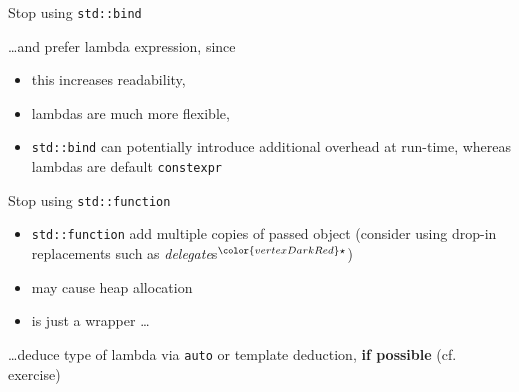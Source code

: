 \begin{frame}[fragile]{Stop using \texttt{std::bind}}

    \ldots and prefer lambda expression, since
    \begin{itemize}
        \item this increases readability,
        \item lambdas are much more flexible,
        \item \texttt{std::bind} can potentially introduce additional overhead at run-time, whereas lambdas are default \texttt{constexpr}
    \end{itemize}
\end{frame}

\begin{frame}[fragile]{Stop using \texttt{std::function}}

    \begin{itemize}
        \item \texttt{std::function} add multiple copies of passed object (consider using drop-in replacements such as \textit{delegate}s${}^{\color{vertexDarkRed}\star}$)
        \item may cause heap allocation
        \item is just a wrapper \ldots
    \end{itemize}
    \ldots deduce type of lambda via \texttt{auto} or template deduction, \textbf{if possible} (cf. exercise)

    \vspace{5mm}

    
\end{frame}
